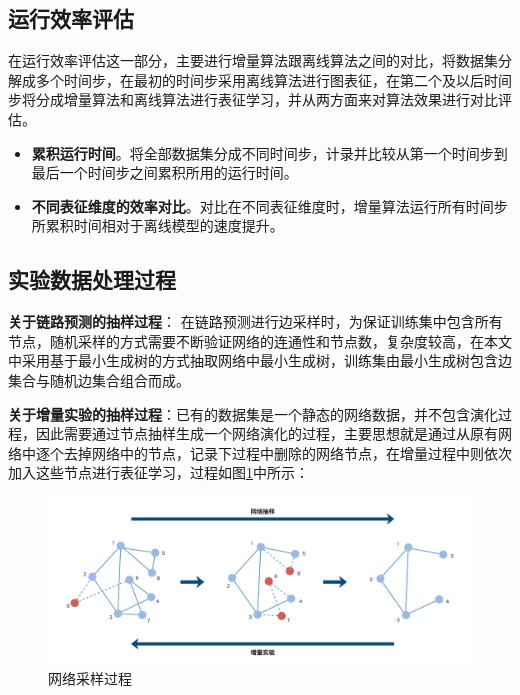 \subsection{运行效率评估}
在运行效率评估这一部分，主要进行增量算法跟离线算法之间的对比，将数据集分解成多个时间步，在最初的时间步采用离线算法进行图表征，在第二个及以后时间步将分成增量算法和离线算法进行表征学习，并从两方面来对算法效果进行对比评估。
\begin{itemize}
	\item \textbf{累积运行时间}。将全部数据集分成不同时间步，计录并比较从第一个时间步到最后一个时间步之间累积所用的运行时间。
	\item \textbf{不同表征维度的效率对比}。对比在不同表征维度时，增量算法运行所有时间步所累积时间相对于离线模型的速度提升。 
\end{itemize}
\subsection{实验数据处理过程}
\textbf{关于链路预测的抽样过程}：
在链路预测进行边采样时，为保证训练集中包含所有节点，随机采样的方式需要不断验证网络的连通性和节点数，复杂度较高，在本文中采用基于最小生成树的方式抽取网络中最小生成树，训练集由最小生成树包含边集合与随机边集合组合而成。

 \textbf{关于增量实验的抽样过程}：已有的数据集是一个静态的网络数据，并不包含演化过程，因此需要通过节点抽样生成一个网络演化的过程，主要思想就是通过从原有网络中逐个去掉网络中的节点，记录下过程中删除的网络节点，在增量过程中则依次加入这些节点进行表征学习，过程如图\ref{fig:network_sample}中所示：
\begin{figure}
	\centering
	\includegraphics[width=6in]{figures/inc_sample}
	\caption{网络采样过程}
	\label{fig:network_sample}
\end{figure}


